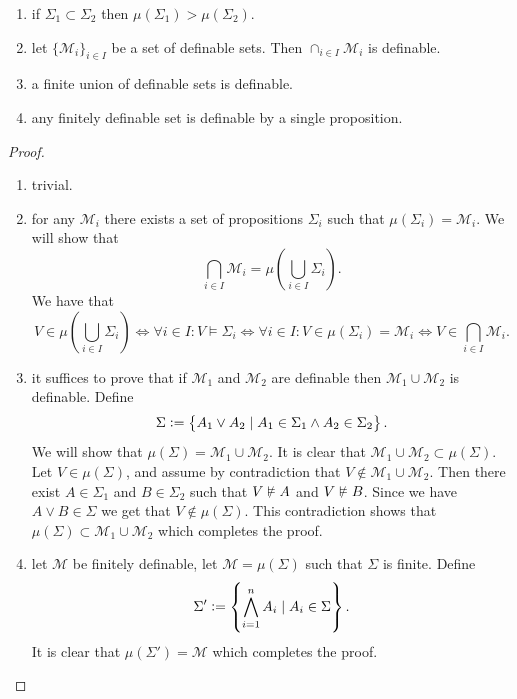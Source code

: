 \documentclass[11pt,a4paper]{article}
\DeclareRobustCommand{\models}{%
  \mathrel{\vDash}%
}
\DeclareRobustCommand{\nmodels}{%
  \mathrel{\text{\ooalign{$\vDash$\cr\hss\raisebox{0.2ex}{\scalebox{0.8}{$/$}}\hss}}}%
}
\begin{document}
\begin{proposition}
  \begin{enumerate}
    \item[(1)] if $\Sigma_1 \subset \Sigma_2$ then
      $\mu(\Sigma_1) > \mu(\Sigma_2)$.
    \item[(2)] let $\{\mathcal M_i\}_{i \in I}$ be a set of definable sets.
      Then $\cap_{i \in I} \mathcal M_i$ is definable.
    \item[(3)] a finite union of definable sets is definable.
    \item[(4)] any finitely definable set is definable by a single
      proposition.
  \end{enumerate}
\end{proposition}
\begin{proof}
  \begin{enumerate}
    \item[(1)] trivial.
    \item[(2)] for any $\mathcal M_i$ there exists a set of propositions
      $\Sigma_i$ such that $\mu(\Sigma_i) = \mathcal M_i$.
      We will show that
      \[
        \bigcap_{i \in I} \mathcal M_i =
        \mu\left(\bigcup_{i \in I} \Sigma_i\right).
      \]
      We have that
      \[
        V \in \mu\left(\bigcup_{i \in I} \Sigma_i\right) \iff
        \forall i \in I \colon V \models \Sigma_i \iff
        \forall i \in I \colon V \in \mu(\Sigma_i) = \mathcal M_i \iff
        V \in \bigcap_{i \in I} \mathcal M_i.
      \]
    \item[(3)] it suffices to prove that if $\mathcal M_1$ and
      $\mathcal M_2$ are definable then $\mathcal M_1 \cup \mathcal M_2$
      is definable. Define
      \[
        \Sigma := \left\{A_1 \lor A_2 \mid A_1 \in \Sigma_1 \land A_2 \in \Sigma_2\right\}.
      \]
      We will show that $\mu(\Sigma) = \mathcal M_1 \cup \mathcal M_2$.
      It is clear that $\mathcal M_1 \cup \mathcal M_2 \subset \mu(\Sigma)$.
      Let $V \in \mu(\Sigma)$, and assume by contradiction that
      $V \notin \mathcal M_1 \cup \mathcal M_2$.
      Then there exist $A \in \Sigma_1$ and $B \in \Sigma_2$ such that
      $V \nmodels A$ and $V \nmodels B$.
      Since we have $A \lor B \in \Sigma$ we get that $V \notin \mu(\Sigma)$.
      This contradiction shows that
      $\mu(\Sigma) \subset \mathcal M_1 \cup \mathcal M_2$
      which completes the proof.
    \item[(4)] let $\mathcal M$ be finitely definable, let 
      $\mathcal M = \mu(\Sigma)$ such that $\Sigma$ is finite.
      Define
      \[
        \Sigma' := \left\{\bigwedge_{i=1}^{n} A_i \mid A_i \in \Sigma\right\}.
      \]
      It is clear that $\mu(\Sigma') = \mathcal M$ which completes the
      proof.
  \end{enumerate}
\end{proof}
\end{document}
